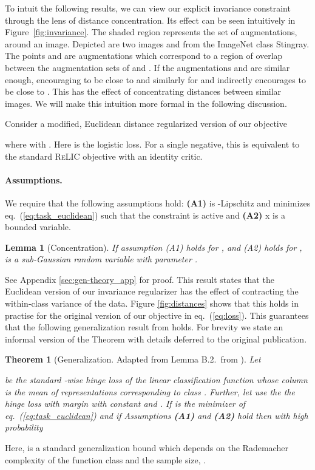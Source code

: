 \documentclass{article}
\def\eqref#1{eq.~(\ref{#1})}
\newcommand{\relic}{\textsc{ReLIC}}
\newtheorem{theorem}{Theorem}
\newtheorem{lemma}{Lemma}
\begin{document}
To intuit the following results, we can view our explicit invariance constraint through the lens of distance concentration. 
Its effect can be seen intuitively in Figure~\ref{fig:invariance}. The shaded region represents the set of augmentations,  around an image. Depicted are two images  and  from the ImageNet class Stingray. 
The points  and  are augmentations which correspond to a region of overlap between the augmentation sets of  and . If the augmentations  and  are similar enough, encouraging  to be close to  and similarly for  and  indirectly encourages  to be close to . This has the effect of concentrating distances between similar images. We will make this intuition more formal in the following discussion.

Consider a modified, Euclidean distance regularized version of our objective 

where  with . Here  is the logistic loss. For a single negative, this is equivalent to the standard \relic{} objective with an identity critic.

\paragraph{Assumptions.}\label{assn:concentration}
We require that the following assumptions hold:
    {\bf (A1)}  is -Lipschitz and minimizes \eqref{eq:task_euclidean} such that the constraint is active and 
    {\bf (A2)} x is a bounded variable.

\begin{lemma}[Concentration\label{lem:concentration}]
If assumption (A1) holds for , and (A2) holds for ,  is a sub-Gaussian random variable with parameter .
\end{lemma}
See Appendix \ref{sec:gen-theory_app} for proof. This result states that the Euclidean version of our invariance regularizer has the effect of contracting the within-class variance of the data. Figure \ref{fig:distances} shows that this holds in practise for the original version of our objective in \eqref{eq:loss}. This guarantees that the following generalization result from \citep{saunshi2019theoretical} holds. For brevity we state an informal version of the Theorem with details deferred to the original publication. 

\begin{theorem}[Generalization. Adapted from Lemma B.2.\ from \citep{saunshi2019theoretical}]
Let 

be the standard -wise hinge loss of the linear classification function  whose  column is   the mean of representations corresponding to class . Further, let  use the the hinge loss with margin  with  constant and .
If  is the minimizer of \eqref{eq:task_euclidean} and if Assumptions \textbf{(A1)} and \textbf{(A2)} hold then with high probability

\end{theorem}
Here,  is a standard generalization bound which depends on the Rademacher complexity of the function class  and the sample size, . 
\end{document}
